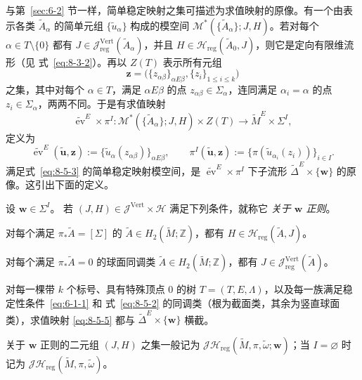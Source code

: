 与第~\ref{sec:6-2} 节一样，简单稳定映射之集可描述为求值映射的原像。有一个由表示各类
$\widetilde A_\alpha$ 的简单元组 $\{\widetilde u_\alpha\}$ 构成的模空间
$\mathcal M^*(\{\widetilde A_\alpha\};J,H)$。若对每个
$\alpha\in T\setminus\{0\}$ 都有
$J\in\mathcal J_{\mathrm{reg}}^{\mathrm{Vert}}(\widetilde A_\alpha)$，并且
$H\in\mathcal H_{\mathrm{reg}}(\widetilde A_0,J)$，则它是定向有限维流形（见
式~\eqref{eq:8-3-2}）。再以 $Z(T)$ 表示所有元组
\[
  \mathbf z=\bigl(\{z_{\alpha\beta}\}_{\alpha E\beta},
    \{z_i\}_{1\le i\le k}\bigr)
\]
之集，其中对每个 $\alpha\in T$，满足 $\alpha E\beta$ 的点
$z_{\alpha\beta}\in\Sigma_\alpha$，连同满足 $\alpha_i=\alpha$ 的点
$z_i\in\Sigma_\alpha$，两两不同。于是有求值映射
\begin{equation}\label{eq:8-5-5}
  \widetilde{\operatorname{ev}}^E\times\pi^I:
  \mathcal M^*(\{\widetilde A_\alpha\};J,H)\times Z(T)
  \longrightarrow\widetilde M^E\times\Sigma^I,
\end{equation}
定义为
\[
  \widetilde{\operatorname{ev}}^E(\widetilde{\mathbf u},\mathbf z)
  :=\{\widetilde u_\alpha(z_{\alpha\beta})\}_{\alpha E\beta},
  \qquad
  \pi^I(\widetilde{\mathbf u},\mathbf z)
  :=\{\pi(\widetilde u_{\alpha_i}(z_i))\}_{i\in I}.
\]
满足式~\eqref{eq:8-5-3} 的简单稳定映射模空间，是
$\widetilde{\operatorname{ev}}^E\times\pi^I$ 下子流形
$\widetilde\Delta^E\times\{\mathbf w\}$ 的原像。这引出下面的定义。

\begin{definition}\label{def:8-5-2}
设
$\mathbf w\in\Sigma^I$。
若 $(J,H)\in\mathcal J^{\mathrm{Vert}}\times\mathcal H$ 满足下列条件，就称它
\emph{关于 $\mathbf w$ 正则}。
\begin{description}[leftmargin=3.8em,style=nextline]
\item[\textup{(H)}] 对每个满足 $\pi_*\widetilde A=[\Sigma]$ 的
$\widetilde A\in H_2(\widetilde M;\mathbb Z)$，都有
$H\in\mathcal H_{\mathrm{reg}}(\widetilde A,J)$。
\item[\textup{(V)}] 对每个满足 $\pi_*\widetilde A=0$ 的球面同调类
$\widetilde A\in H_2(\widetilde M;\mathbb Z)$，都有
$J\in\mathcal J_{\mathrm{reg}}^{\mathrm{Vert}}(\widetilde A)$。
\item[\textup{(EW)}] 对每一棵带 $k$ 个标号、具有特殊顶点 $0$ 的树
$T=(T,E,\Lambda)$，以及每一族满足稳定性条件~\eqref{eq:6-1-1} 和
式~\eqref{eq:8-5-2} 的同调类（根为截面类，其余为竖直球面类），求值映射
\eqref{eq:8-5-5} 都与 $\widetilde\Delta^E\times\{\mathbf w\}$ 横截。
\end{description}
关于 $\mathbf w$ 正则的二元组 $(J,H)$ 之集一般记为
$\mathcal J\mathcal H_{\mathrm{reg}}
(\widetilde M,\pi,\widetilde\omega;\mathbf w)$；当 $I=\varnothing$ 时记为
$\mathcal J\mathcal H_{\mathrm{reg}}
(\widetilde M,\pi,\widetilde\omega)$。
\end{definition}


